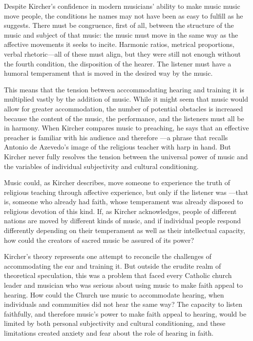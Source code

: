 Despite Kircher's confidence in modern musicians' ability to make music music 
move people, the conditions he names may not have been as easy to fulfill as he 
suggests.
There must be congruence, first of all, between the structure of the music and 
subject of that music: the music must move in the same way as the affective 
movements it seeks to incite.
Harmonic ratios, metrical proportions, verbal rhetoric---all of these must 
align, but they were still not enough without the fourth condition, the 
disposition of the hearer.
The listener must have a humoral temperament that is moved in the desired way 
by the music. 

This means that the tension between acccommodating hearing and training it is 
multiplied vastly by the addition of music.
While it might seem that music would allow for greater accommodation, the 
number of potential obstacles is increased because the content of the music, the 
performance, and the listeners must all be in harmony.
When Kircher compares music to preaching, he says that an effective preacher is 
familiar with his audience and therefore ---a phrase that recalls Antonio de Azevedo's image of the religious 
teacher with harp in hand.%
    \Autocite
    [551: .]
    {Kircher:Musurgia}
But Kircher never fully resolves the tension between the universal power of 
music and the variables of individual subjectivity and cultural conditioning.

Music could, as Kircher describes, move someone to experience the truth of 
religious teaching through affective experience, but only if the listener was 
---that is, someone who already 
had faith, whose temperament was already disposed to religious devotion of this 
kind. 
If, as Kircher acknowledges, people of different nations are moved by different 
kinds of music, and if individual people respond differently depending on their 
temperament as well as their intellectual capacity, how could the creators of 
sacred music be assured of its power?

Kircher's theory represents one attempt to reconcile the challenges of 
accommodating the ear and training it. 
But outside the erudite realm of theoretical speculation, this was a problem 
that faced every Catholic church leader and musician who was serious about 
using music to make faith appeal to hearing.
How could the Church use music to accommodate hearing, when individuals and 
communities did not hear the same way? 
The capacity to listen faithfully, and therefore music's power to make faith 
appeal to hearing, would be limited by both personal subjectivity and cultural 
conditioning, and these limitations created anxiety and fear about the role of 
hearing in faith.


